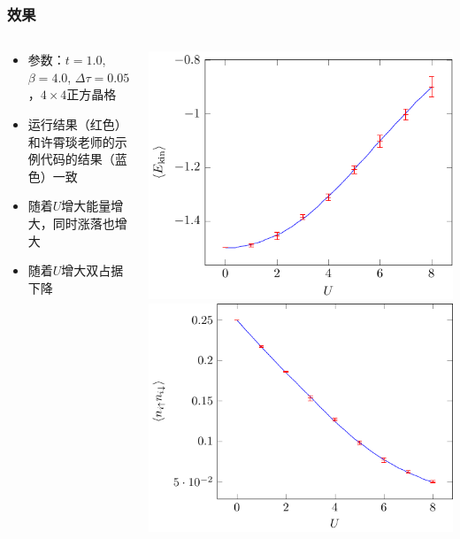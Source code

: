 \documentclass[UTF8]{ctexbeamer}
\begin{document}
\begin{frame}
\frametitle{效果}

\begin{columns}

    \begin{column}{0.5\textwidth}
        \begin{itemize}
            \item 参数：$t=1.0$, $\beta = 4.0$, $\Delta \tau = 0.05$，$4 \times 4$正方晶格
            \item 运行结果（红色）和许霄琰老师的示例代码的结果（蓝色）一致
            \item 随着$U$增大能量增大，同时涨落也增大
            \item 随着$U$增大双占据下降
        \end{itemize}
    \end{column}

    \begin{column}{0.4\textwidth}
        \includegraphics[width=\textwidth]{T_compare.pdf}
        \includegraphics[width=\textwidth]{double_occ_compare.pdf}
    \end{column}
\end{columns}  

\end{frame}
\end{document}
